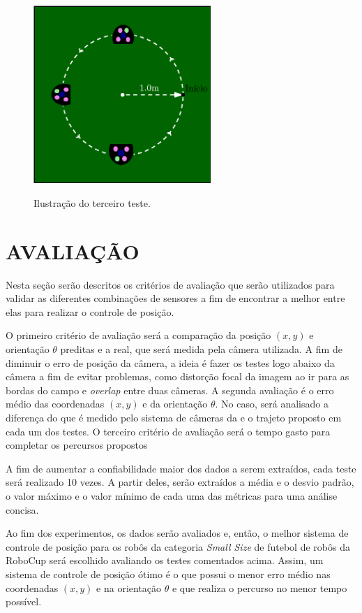 \documentclass[acronym, symbols]{fei}
\begin{document}
		\begin{figure}[!htb]
			\centering
			\caption{Ilustração do terceiro teste.}
			\includegraphics[width=0.6\textwidth]{teste_3.eps}
			\label{fig:metodologia_teste_3}
		\end{figure}
		
	\section{AVALIAÇÃO}
	
		Nesta seção serão descritos os critérios de avaliação que serão utilizados para validar as diferentes combinações de sensores a fim de encontrar a melhor entre elas para realizar o controle de posição.
		
		O primeiro critério de avaliação será a comparação da posição $(x, y)$ e orientação $\theta$ preditas e a real, que será medida pela câmera utilizada. A fim de diminuir o erro de posição da câmera, a ideia é fazer os testes logo abaixo da câmera a fim de evitar problemas, como distorção focal da imagem ao ir para as bordas do campo e \textit{overlap} entre duas câmeras. A segunda avaliação é o erro médio das coordenadas $(x ,y)$ e da orientação $\theta$. No caso, será analisado a diferença do que é medido pelo sistema de câmeras da  e o trajeto proposto em cada um dos testes. O terceiro critério de avaliação será o tempo gasto para completar os percursos propostos
		
		A fim de aumentar a confiabilidade maior dos dados a serem extraídos, cada teste será realizado 10 vezes. A partir deles, serão extraídos a média e o desvio padrão, o valor máximo e o valor mínimo de cada uma das métricas para uma análise concisa.
		
		Ao fim dos experimentos, os dados serão avaliados e, então, o melhor sistema de controle de posição para os robôs da categoria \textit{Small Size} de futebol de robôs da RoboCup será escolhido avaliando os testes comentados acima. Assim, um sistema de controle de posição ótimo é o que possui o menor erro médio nas coordenadas $(x, y)$ e na orientação $\theta$ e que realiza o percurso no menor tempo possível.
	
	\printbibliography
\end{document}
